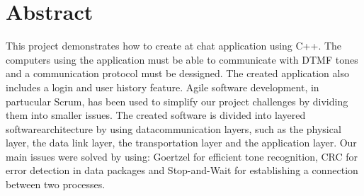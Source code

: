 \section{Abstract}
This project demonstrates how to create at chat application using C++. The computers using the application must be able to communicate with DTMF tones and a communication protocol must be dessigned.
The created application also includes a login and user history feature.
\newline
Agile software development, in partucular Scrum, has been used to simplify our project challenges by dividing them into smaller issues.
\newline
The created software is divided into layered softwarearchitecture by using datacommunication layers, such as the physical layer, the data link layer, the transportation layer and the application layer. Our main issues were solved by using: Goertzel for efficient tone recognition, CRC for error detection in data packages and Stop-and-Wait for establishing a connection between two processes.